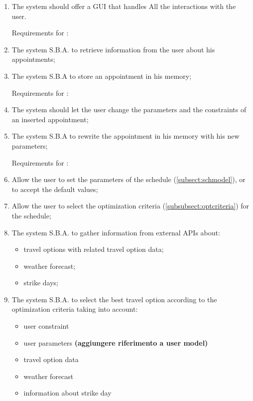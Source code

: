 \begin{enumerate}

\item The system should offer a GUI that handles All the interactions with the user.

Requirements for :

\renewcommand\labelenumi{\textbf{R\theenumi}}

\item The system S.B.A. to retrieve information from the user about his appointments; \label{req:R1}

\item The system S.B.A to store an appointment in his memory;


Requirements for :

\item The system should let the user change the parameters and the constraints of an inserted appointment; 

\item The system S.B.A to rewrite the appointment in his memory with his new parameters;

Requirements for :


\item Allow the user to set the parameters of the schedule (\ref{subsect:schmodel}), or to accept the default values;
 
\item Allow the user to select the optimization criteria (\ref{subsubsect:optcriteria}) for the schedule;

\item The system S.B.A. to gather information from external APIs about: 
\begin{itemize}
\item travel options with related travel option data; 
\item weather forecast;
\item strike days;
\end{itemize}

\item The system S.B.A. to select the best travel option according to the optimization criteria taking into account:
\begin{itemize}
\item user constraint
\item user parameters \textbf{(aggiungere riferimento a user model)}
\item travel option data 
\item weather forecast
\item information about strike day
\end{itemize}


\end{enumerate}
